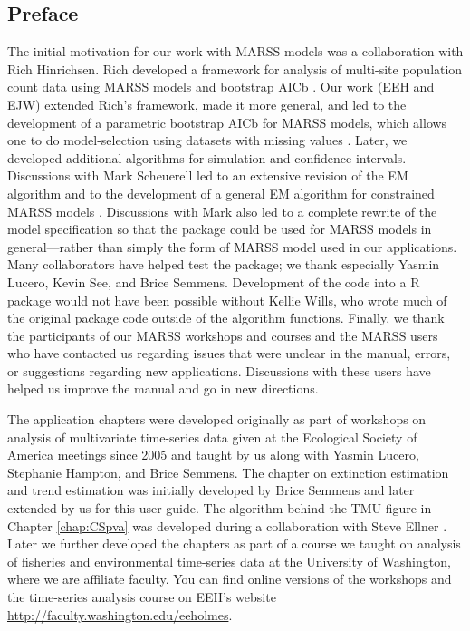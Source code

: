 \subsection*{Preface}

The initial motivation for our work with MARSS models was a collaboration with Rich Hinrichsen. Rich developed a framework for analysis of multi-site population count data using MARSS models and bootstrap AICb \citep{HinrichsenHolmes2009}. Our work (EEH and EJW) extended Rich's framework, made it more general, and led to the development of a parametric bootstrap AICb for MARSS models, which allows one to do model-selection using datasets with missing values \citep{Wardetal2010, HolmesWard2010}.  Later, we developed additional algorithms for simulation and confidence intervals.  Discussions with Mark Scheuerell led to an extensive revision of the EM algorithm and to the development of a general EM algorithm for constrained MARSS models \citep{Holmes2010}.  Discussions with Mark also led to a complete rewrite of the model specification so that the package could be used for MARSS models in general---rather than simply the form of MARSS model used in our applications.  Many collaborators have helped test the package; we thank especially Yasmin Lucero, Kevin See, and Brice Semmens.  Development of the code into a R package would not have been possible without Kellie Wills, who wrote much of the original package code outside of the algorithm functions.  Finally, we thank the participants of our MARSS workshops and courses and the MARSS users who have contacted us regarding issues that were unclear in the manual, errors, or suggestions regarding new applications.  Discussions with these users have helped us improve the manual and go in new directions.

The application chapters were developed originally as part of workshops on analysis of multivariate time-series data given at the Ecological Society of America meetings since 2005 and taught by us along with Yasmin Lucero, Stephanie Hampton, and Brice Semmens.  The chapter on extinction estimation and trend estimation was initially developed by Brice Semmens and later extended by us for this user guide. The algorithm behind the TMU figure in Chapter \ref{chap:CSpva} was developed during a collaboration with Steve Ellner \citep{EllnerHolmes2008}.  Later we further developed the chapters as part of a course we taught on analysis of fisheries and environmental time-series data at the University of Washington, where  we are affiliate faculty.  You can find online versions of the workshops and the time-series analysis course on EEH's website \url{http://faculty.washington.edu/eeholmes}.
 
